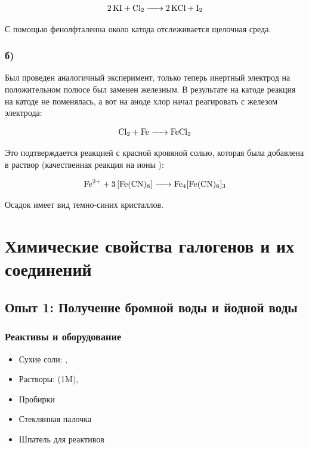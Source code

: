 \documentclass[a4paper, 12pt]{article}
\begin{document}
\begin{equation}
	\ce{2KI + Cl2 -> 2KCl + I2}
\end{equation}

С помощью фенолфталеина около катода отслеживается щелочная среда.

\subsubsection*{б)}

Был проведен аналогичный эксперимент, только теперь инертный электрод на положительном полюсе был заменен железным. В результате на катоде реакция на катоде не поменялась, а вот на аноде хлор начал реагировать с железом электрода:

\begin{equation}
	\ce{Cl2 + Fe -> FeCl2}
\end{equation}

Это подтверждается реакцией с красной кровяной солью, которая была добавлена в раствор (качественная реакция на ионы ):

\begin{equation}
	\ce{Fe^{2+} + 3[Fe(CN)6] -> Fe4[Fe(CN)6]3}
\end{equation}

Осадок имеет вид темно-синих кристаллов.


\newpage


\section{Химические свойства галогенов и их соединений}


\subsection{Опыт 1: Получение бромной воды и йодной воды}

\subsubsection{Реактивы и оборудование}

\begin{itemize}
	\item Сухие соли: , 
	\item Растворы:  (1M), 
	
	\item Пробирки
	
	\item Стеклянная палочка
	
	\item Шпатель для реактивов
\end{itemize}
\end{document}
